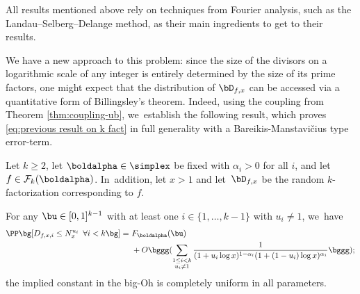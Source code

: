 All results mentioned above rely on techniques from Fourier analysis, such as the Landau--Selberg--Delange method, as their main ingredients to get to their results.

We have a new approach to this problem: since the size of the divisors on a logarithmic scale of any integer is entirely determined by the size of its prime factors, one might expect that the distribution of $\bD_{f, x}$ can be accessed via a quantitative form of Billingsley's theorem. Indeed, using the coupling from Theorem \ref{thm:coupling-ub}, we~establish the following result, which proves \eqref{eq:previous result on k fact} in full generality with a Bareikis-Manstavi\v{c}ius type error-term.

\begin{theo}
\label{thm:fact into k parts}
Let $k \ge 2$, let $\boldalpha \in\nobreak \simplex$ be fixed with $\alpha_i > 0$ for all $i$, and let $f\in\mathcal{F}_k(\boldalpha)$. In~addition, let $x>1$ and let~$\bD_{f, x}$ be the random $k$-factorization corresponding to $f$.

For any $\bu \in [0, 1]^{k-1}$ with at least one $i \in \{1, \ldots, k-1\}$ with $u_i \ne 1$, we~have
\begin{align*}
\PP\bg[D_{f, x,i} \le N_x^{u_i}\ \, \forall i < k\bg] =\ &F_{\boldalpha}(\bu)\\
&+ O\bggg(\sum_{\substack{1 \le i < k \\ u_i \ne 1}} \frac{1}{(1+u_i\log x)^{1-\alpha_i}(1+(1-u_i)\log x)^{\alpha_i}}\bggg);
\end{align*}
the implied constant in the big-Oh is completely uniform in all parameters.
\end{theo}

